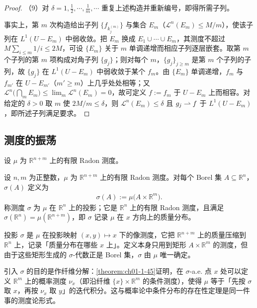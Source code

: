 \documentclass[../../main.tex]{subfiles}%
\begin{document}
\begin{proof}
（9）对 $\delta=1,\frac{1}{2},\cdots,\frac{1}{m},\cdots$ 重复上述构造并重新编号，即得所需子列。

事实上，第 $m$ 次构造给出子列 $\{f_{k_j^{(m)}}\}$ 与集合 $E_m$（$\mathcal{L}^n(E_m)\leqslant M/m$），使该子列在 $L^1(U-E_m)$ 中弱收敛。把 $E_m$ 换成 $E_1\cup\cdots\cup E_m$，其测度不超过 $M\sum_{i\leqslant m}1/i\leqslant2M$，可设 $\{E_m\}$ 关于 $m$ 单调递增而相应子列逐层嵌套。取第 $m$ 个子列的第 $m$ 项构成对角子列 $\{g_j\}$；则对每个 $m$，$\{g_j\}_{j\geqslant m}$ 是第 $m$ 个子列的子列，故 $\{g_j\}$ 在 $L^1(U-E_m)$ 中弱收敛于某个 $f_m$。由 $\{E_m\}$ 单调递增，$f_m$ 与 $f_{m'}$ 在 $U-E_{m'}$（$m'\geqslant m$）上几乎处处相等；又 $\mathcal{L}^n\bigl(\bigcap_mE_m\bigr)\leqslant\lim_m\mathcal{L}^n(E_m)=0$，故可定义 $f:=f_m$ 于 $U-E_m$ 上而相容。对给定的 $\delta>0$ 取 $m$ 使 $2M/m\leqslant\delta$，则 $\mathcal{L}^n(E_m)\leqslant\delta$ 且 $g_j\rightharpoonup f$ 于 $L^1(U-E_m)$，即所述子列满足要求。
\end{proof}

\subsection{测度的振荡}\label{subsection:ch01-09-4}

设 $\mu$ 为 $\mathbb{R}^{n+m}$ 上的有限 Radon 测度。

\begin{definition}[投影]\label{definition:ch01-1-33}
设 $n,m$ 为正整数，$\mu$ 为 $\mathbb{R}^{n+m}$ 上的有限 Radon 测度。对每个 Borel 集 $A\subseteq\mathbb{R}^n$，$\sigma(A)$ 定义为
\begin{align*}
\sigma(A):=\mu\bigl(A\times\mathbb{R}^m\bigr).
\end{align*}
称测度 $\sigma$ 为 $\mu$ 在 $\mathbb{R}^n$ 上的投影；它是 $\mathbb{R}^n$ 上的有限 Radon 测度，且满足 $\sigma(\mathbb{R}^n)=\mu(\mathbb{R}^{n+m})$，即 $\sigma$ 记录 $\mu$ 在 $x$ 方向上的质量分布。
\end{definition}

\begin{remark}\label{remark:ch01-def-1-33-动机}
投影 $\sigma$ 是 $\mu$ 在投影映射 $(x,y)\mapsto x$ 下的像测度，它把 $\mathbb{R}^{n+m}$ 上的质量压缩到 $\mathbb{R}^n$ 上，记录「质量分布在哪些 $x$ 上」。定义本身只用到矩形 $A\times\mathbb{R}^m$ 的测度，但由于这些矩形生成的 $\sigma$-代数正是 Borel 集，$\sigma$ 由 $\mu$ 唯一确定。

引入 $\sigma$ 的目的是作纤维分解：\cref{theorem:ch01-1-45}证明，在 $\sigma$-a.e. 点 $x$ 处可以定义 $\mathbb{R}^m$ 上的概率测度 $\nu_x$（即沿纤维 $\{x\}\times\mathbb{R}^m$ 的条件测度），使得 $\mu$ 等于「先按 $\sigma$ 取 $x$，再按 $\nu_x$ 取 $y$」的迭代积分。这与概率论中条件分布的存在性定理是同一件事的测度论形式。%
\end{remark}
\end{document}
